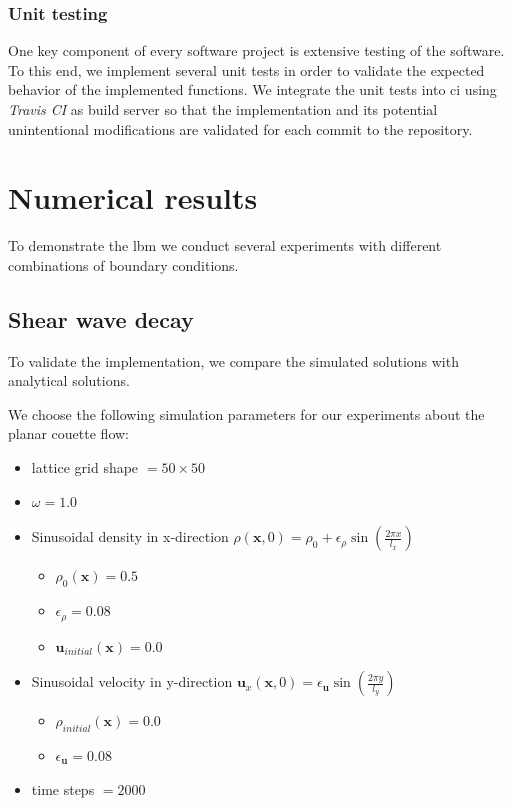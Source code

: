 \documentclass[a4paper,11pt, footsepline]{book}
\begin{document}
\subsection*{Unit testing}
One key component of every software project is extensive testing of the software. To this end, we implement several unit tests in order to validate the expected behavior of the implemented functions. We integrate the unit tests into \ac{ci} using \textit{Travis CI} as build server so that the implementation and its potential unintentional modifications are validated for each commit to the repository.
\chapter{Numerical results}\label{ch-results}
To demonstrate the \ac{lbm} we conduct several experiments with different combinations of boundary conditions.
\section{Shear wave decay}
To validate the implementation, we compare the simulated solutions with analytical solutions.

We choose the following simulation parameters for our experiments about the planar couette flow:
\begin{itemize}
\setlength\itemsep{0.15em}
\item lattice grid shape $=50\times 50$
\item $\omega=1.0$
\item Sinusoidal density in x-direction $\rho(\mathbf{x},0)=\rho_{0}+\epsilon_{\rho}\sin(\frac{2\pi x}{l_x})$
\begin{itemize}
\setlength\itemsep{0.1em}
\item $\rho_{0}(\mathbf{x})=0.5$
\item $\epsilon_{\rho}=0.08$
\item $\mathbf{u}_{initial}(\mathbf{x})=0.0$
\end{itemize}
\item Sinusoidal velocity in y-direction $\mathbf{u}_{x}(\mathbf{x},0)=\epsilon_{\mathbf{u}}\sin(\frac{2\pi y}{l_y})$
\begin{itemize}
\setlength\itemsep{0.1em}
\item $\rho_{initial}(\mathbf{x})=0.0$
\item $\epsilon_{\mathbf{u}}=0.08$
\end{itemize}
\item time steps $=2000$
\end{itemize}
\end{document}
